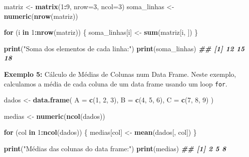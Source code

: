 \documentclass[
]{book}
\newenvironment{Shaded}{\begin{snugshade}}{\end{snugshade}}
\newcommand{\AttributeTok}[1]{\textcolor[rgb]{0.13,0.29,0.53}{#1}}
\newcommand{\ControlFlowTok}[1]{\textcolor[rgb]{0.13,0.29,0.53}{\textbf{#1}}}
\newcommand{\DecValTok}[1]{\textcolor[rgb]{0.00,0.00,0.81}{#1}}
\newcommand{\DocumentationTok}[1]{\textcolor[rgb]{0.56,0.35,0.01}{\textbf{\textit{#1}}}}
\newcommand{\FunctionTok}[1]{\textcolor[rgb]{0.13,0.29,0.53}{\textbf{#1}}}
\newcommand{\NormalTok}[1]{#1}
\newcommand{\OtherTok}[1]{\textcolor[rgb]{0.56,0.35,0.01}{#1}}
\newcommand{\SpecialCharTok}[1]{\textcolor[rgb]{0.81,0.36,0.00}{\textbf{#1}}}
\newcommand{\StringTok}[1]{\textcolor[rgb]{0.31,0.60,0.02}{#1}}
\begin{document}
\begin{Shaded}
\begin{Highlighting}[]
\NormalTok{matriz }\OtherTok{\textless{}{-}} \FunctionTok{matrix}\NormalTok{(}\DecValTok{1}\SpecialCharTok{:}\DecValTok{9}\NormalTok{, }\AttributeTok{nrow=}\DecValTok{3}\NormalTok{, }\AttributeTok{ncol=}\DecValTok{3}\NormalTok{)}
\NormalTok{soma\_linhas }\OtherTok{\textless{}{-}} \FunctionTok{numeric}\NormalTok{(}\FunctionTok{nrow}\NormalTok{(matriz))}

\ControlFlowTok{for}\NormalTok{ (i }\ControlFlowTok{in} \DecValTok{1}\SpecialCharTok{:}\FunctionTok{nrow}\NormalTok{(matriz)) \{}
\NormalTok{  soma\_linhas[i] }\OtherTok{\textless{}{-}} \FunctionTok{sum}\NormalTok{(matriz[i, ])}
\NormalTok{\}}

\FunctionTok{print}\NormalTok{(}\StringTok{"Soma dos elementos de cada linha:"}\NormalTok{)}
\FunctionTok{print}\NormalTok{(soma\_linhas)}
\DocumentationTok{\#\# [1] 12 15 18}
\end{Highlighting}
\end{Shaded}

\textbf{Exemplo 5:} Cálculo de Médias de Colunas num Data Frame. Neste
exemplo, calculamos a média de cada coluna de um data frame usando um
loop \texttt{for}.

\begin{Shaded}
\begin{Highlighting}[]
\NormalTok{dados }\OtherTok{\textless{}{-}} \FunctionTok{data.frame}\NormalTok{(}
\AttributeTok{A =} \FunctionTok{c}\NormalTok{(}\DecValTok{1}\NormalTok{, }\DecValTok{2}\NormalTok{, }\DecValTok{3}\NormalTok{),}
\AttributeTok{B =} \FunctionTok{c}\NormalTok{(}\DecValTok{4}\NormalTok{, }\DecValTok{5}\NormalTok{, }\DecValTok{6}\NormalTok{),}
\AttributeTok{C =} \FunctionTok{c}\NormalTok{(}\DecValTok{7}\NormalTok{, }\DecValTok{8}\NormalTok{, }\DecValTok{9}\NormalTok{)}
\NormalTok{)}

\NormalTok{medias }\OtherTok{\textless{}{-}} \FunctionTok{numeric}\NormalTok{(}\FunctionTok{ncol}\NormalTok{(dados))}

\ControlFlowTok{for}\NormalTok{ (col }\ControlFlowTok{in} \DecValTok{1}\SpecialCharTok{:}\FunctionTok{ncol}\NormalTok{(dados)) \{}
\NormalTok{  medias[col] }\OtherTok{\textless{}{-}} \FunctionTok{mean}\NormalTok{(dados[, col])}
\NormalTok{\}}

\FunctionTok{print}\NormalTok{(}\StringTok{"Médias das colunas do data frame:"}\NormalTok{)}
\FunctionTok{print}\NormalTok{(medias)}
\DocumentationTok{\#\# [1] 2 5 8}
\end{Highlighting}
\end{Shaded}
\end{document}
